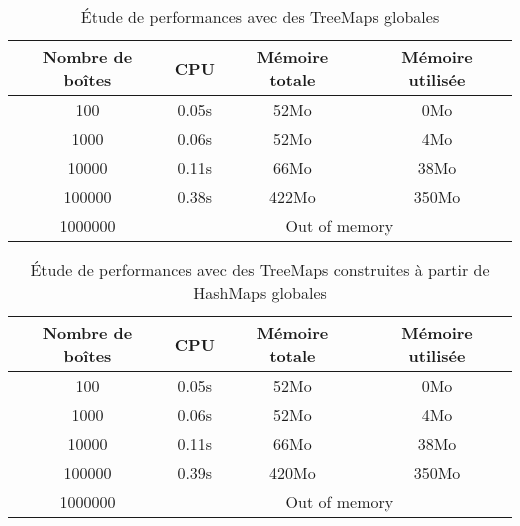\begin{table}[h]
  \centering
\begin{tabular}{|c|c|c|c|}
\hline
Nombre de boîtes & CPU & Mémoire totale & Mémoire utilisée\\
\hline
100 & 0.05s & 52Mo & 0Mo\\
\hline
1000 & 0.06s & 52Mo & 4Mo\\
\hline
10000 & 0.11s & 66Mo & 38Mo\\
\hline
100000 & 0.38s & 422Mo & 350Mo\\
\hline
1000000 & \multicolumn{3}{|c|}{Out of memory}\\
\hline
\end{tabular}
\caption{Étude de performances avec des TreeMaps globales} 
\label{tab:treemapglobal}
\end{table}




\begin{table}[h]
  \centering
\begin{tabular}{|c|c|c|c|}
\hline
Nombre de boîtes & CPU & Mémoire totale & Mémoire utilisée\\
\hline
100 & 0.05s & 52Mo & 0Mo\\
\hline
1000 & 0.06s & 52Mo & 4Mo\\
\hline
10000 & 0.11s & 66Mo & 38Mo\\
\hline
100000 & 0.39s & 420Mo & 350Mo\\
\hline
1000000 & \multicolumn{3}{|c|}{Out of memory}\\
\hline
\end{tabular}
\caption{Étude de performances avec des TreeMaps construites à partir de HashMaps globales} 
\label{tab:treehashmapglobal}
\end{table}

